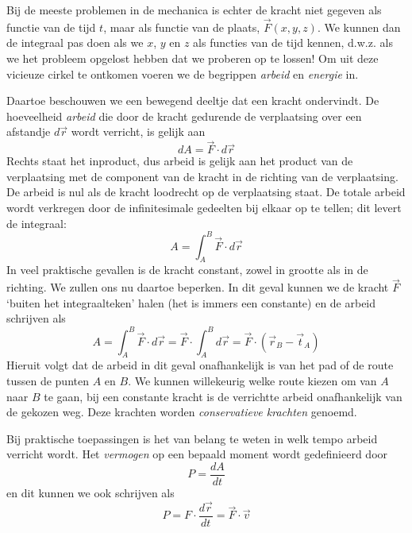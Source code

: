 Bij de meeste problemen in de mechanica is echter de kracht niet
gegeven als functie van de tijd $t$, maar als functie van de plaats,
$\vec{F}(x,y,z)$. We kunnen dan de integraal pas doen als we $x$, $y$
en $z$ als functies van de tijd kennen, d.w.z. als we het probleem
opgelost hebben dat we proberen op te lossen! Om uit deze vicieuze
cirkel te ontkomen voeren we de begrippen {\it arbeid} en {\it
energie} in.

Daartoe beschouwen we een bewegend deeltje dat een kracht
ondervindt. De hoeveelheid {\it arbeid} die door de kracht gedurende de
verplaatsing over een afstandje $d\vec{r}$ wordt verricht, is gelijk aan
\begin{equation}
dA = \vec{F} \cdot d \vec{r} 
\end{equation}
Rechts staat het inproduct, dus arbeid is gelijk aan het product van
de verplaatsing met de component van de kracht in de richting van de
verplaatsing. De arbeid is nul als de kracht loodrecht op de
verplaatsing staat. De totale arbeid wordt verkregen door de 
infinitesimale gedeelten bij elkaar op te tellen; dit levert de integraal:
\begin{equation}
A = \int_A^B \vec{F} \cdot d\vec{r} 
\end{equation}
In veel praktische gevallen is de kracht constant, zowel in grootte
als in de richting. We zullen ons nu daartoe beperken.  In dit geval
kunnen we de kracht $\vec{F}$ `buiten het integraalteken' halen (het
is immers een constante) en de arbeid schrijven als
\begin{equation}
A = \int_A^B \vec{F} \cdot d\vec{r} = \vec{F}\cdot \int_A^B d \vec{r} = \vec{F} \cdot(\vec{r}_B-\vec{t}_A) 
\end{equation}
Hieruit volgt dat de arbeid in dit geval onafhankelijk is van het pad
of de route tussen de punten $A$ en $B$. We kunnen willekeurig welke
route kiezen om van $A$ naar $B$ te gaan, bij een constante kracht is
de verrichtte arbeid onafhankelijk van de gekozen weg. Deze krachten
worden {\it conservatieve krachten} genoemd.

Bij praktische toepassingen is het van belang te weten in welk tempo arbeid verricht wordt. Het {\it vermogen} op een bepaald moment wordt gedefinieerd door 
\begin{equation}\label{e:vermogen}
P = \frac{dA}{dt}
\end{equation}
en dit kunnen we ook schrijven als
\begin{equation}\label{e:vermogen2}
P = F \cdot \frac{d \vec{r}}{dt} = \vec{F} \cdot \vec{v}
\end{equation}

